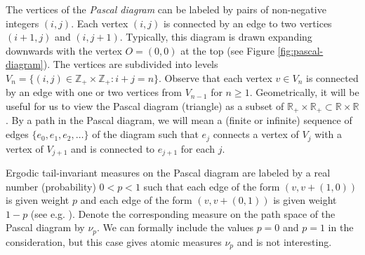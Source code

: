 \documentclass[11pt, twoside]{amsart}
\theoremstyle{definition}
\theoremstyle{remark}
\theoremstyle{plain}
\newcommand{\tcr}{\textcolor{red}}
\numberwithin{equation}{section}
\begin{document}
The vertices of the \textit{Pascal diagram} can be labeled by pairs of non-negative integers $(i,j)$. Each vertex $(i,j)$ is connected by an edge to two vertices $(i+1,j)$ and $(i,j+1)$. Typically, this diagram is drawn expanding downwards with the vertex $O=(0,0)$ at the top (see Figure \ref{fig:pascal-diagram}). The vertices are subdivided into levels $V_n=\{(i,j)\in \mathbb Z_+\times\mathbb Z_+:i+j=n\}$. Observe that each vertex $v\in V_n$ is connected by an edge with one or two vertices from $V_{n-1}$ for $n\geqslant 1$. Geometrically, it will be useful for us to view the Pascal diagram (triangle) as a subset of $\mathbb R_+\times\mathbb R_+\subset \mathbb R\times\mathbb R$. By a path in the Pascal diagram, we will mean a (finite or infinite) sequence of edges 
$\{e_0,e_{1},e_{2},\ldots\}$ of the diagram such that $e_j$ connects a vertex of $V_j$ with a vertex of $V_{j+1}$ and is connected to $e_{j+1}$ for each $j$.

Ergodic tail-invariant measures on the Pascal diagram are labeled by a real number (probability) $0 < p < 1$ such that each edge of the form $(v,v+(1,0))$ is given weight $p$ and each edge of the form $(v,v+(0,1))$ is given weight $1-p$ (see e.g. \cite{MelaPetersen2005}). Denote the corresponding measure on the path space of the Pascal diagram by $\nu_p$. We can formally include the values
$p = 0$ and $p = 1$ in the consideration, but this case gives atomic measures $\nu_p$ and is not interesting.


\end{document}
